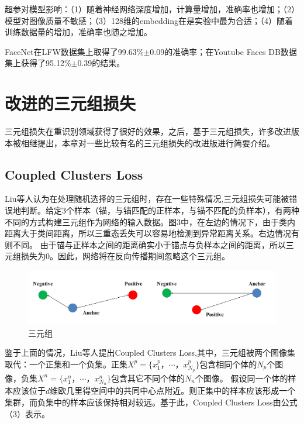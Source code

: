 \documentclass[a4paper]{article}
\begin{document}
    超参对模型影响：（1）随着神经网络深度增加，计算量增加，准确率也增加；（2）模型对图像质量不敏感；（3）128维的embedding在是实验中最为合适；（4）随着训练数据量的增加，准确率也随之增加。

    FaceNet在LFW数据集上取得了99.63\%$\pm$0.09的准确率；在Youtube Faces DB数据集上获得了95.12\%$\pm$0.39的结果。

    
    \section{改进的三元组损失}

    三元组损失在重识别领域获得了很好的效果，之后，基于三元组损失，许多改进版本被相继提出，本章对一些比较有名的三元组损失的改进版进行简要介绍。

    \subsection{Coupled Clusters Loss}

    Liu等人认为在处理随机选择的三元组时，存在一些特殊情况,三元组损失可能被错误地判断。给定3个样本（锚，与锚匹配的正样本，与锚不匹配的负样本），有两种不同的方式构建三元组作为网络的输入数据。图3中，在左边的情况下，由于类内距离大于类间距离，所以三重态丢失可以容易地检测到异常距离关系。右边情况有则不同。 由于锚与正样本之间的距离确实小于锚点与负样本之间的距离，所以三元组损失为0。因此，网络将在反向传播期间忽略这个三元组。

    \begin{figure}[H]
        \centering
        \includegraphics[width=0.9\linewidth]{./images/cvpr16_error_case.png}
        \caption{三元组}
        \label{fig:cvpr16_error_case}
    \end{figure}

    鉴于上面的情况，Liu等人提出Coupled Clusters Loss\cite{cvpr16triplet},其中，三元组被两个图像集取代：一个正集和一个负集。正集$X^p = \{x_1^p，\cdots，x_{N_p}^p\}$包含相同个体的$N_p$个图像，负集$X^n = \{x_1^n，\cdots，x_{N_n}^n\}$包含其它不同个体的$N_n$个图像。 假设同一个体的样本应该位于$d$维欧几里得空间中的共同中心点附近。则正集中的样本应该形成一个集群，而负集中的样本应该保持相对较远。基于此，Coupled Clusters Loss由公式（3）表示。
\end{document}
